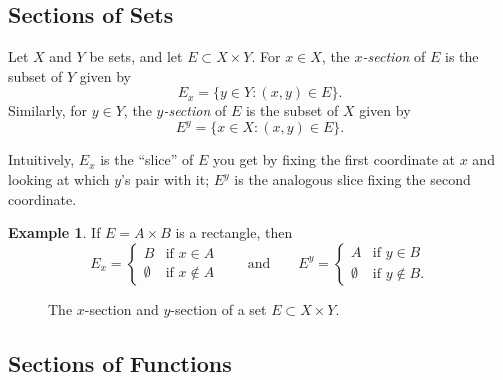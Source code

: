 \documentclass[11pt]{article}
\theoremstyle{definition}
\newtheorem{example}[definition]{Example}
\theoremstyle{plain}
\begin{document}
\subsection{Sections of Sets}

Let $X$ and $Y$ be sets, and let $E \subset X \times Y$. For $x \in X$,
the \emph{$x$-section} of $E$ is the subset of $Y$ given by
\[
  E_x = \{ y \in Y : (x,y) \in E \}.
\]
Similarly, for $y \in Y$, the \emph{$y$-section} of $E$ is the subset
of $X$ given by
\[
  E^{y} = \{ x \in X : (x,y) \in E \}.
\]

Intuitively, $E_x$ is the ``slice'' of $E$ you get by fixing the first
coordinate at $x$ and looking at which $y$'s pair with it; $E^{y}$ is
the analogous slice fixing the second coordinate.

\begin{example}
If $E = A \times B$ is a rectangle, then
\[
  E_x = \begin{cases} B & \text{if } x \in A \\ \emptyset & \text{if } x \notin A \end{cases}
  \qquad \text{and} \qquad
  E^{y} = \begin{cases} A & \text{if } y \in B \\ \emptyset & \text{if } y \notin B. \end{cases}
\]
\end{example}

\begin{figure}[H]
\centering
{}
\caption{The $x$-section and $y$-section of a set $E \subset X \times Y$.}
\end{figure}

\subsection{Sections of Functions}
\end{document}
